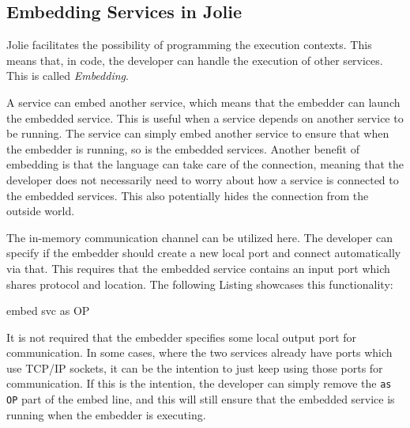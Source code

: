 \subsection{Embedding Services in Jolie}
Jolie facilitates the possibility of programming the execution contexts.
This means that, in code, the developer can handle the execution of other services. This is called \textit{Embedding}.

A service can embed another service, which means that the embedder can launch the embedded service. This is useful when a service depends on another service to be running.
The service can simply embed another service to ensure that when the embedder is running, so is the embedded services.
Another benefit of embedding is that the language can take care of the connection, meaning that the developer does not necessarily need to worry about how a service is connected to the embedded services.
This also potentially hides the connection from the outside world.

The in-memory communication channel can be utilized here. The developer can specify if the embedder should create a new local port and connect automatically via that. This requires that the embedded service contains an input port which shares protocol and location.
The following Listing showcases this functionality:

\begin{jolisting}[][caption={
    }, label=lst:embed-as]
embed svc as OP
\end{jolisting}

It is not required that the embedder specifies some local output port for communication. In some cases, where the two services already have ports which use TCP/IP sockets,
it can be the intention to just keep using those ports for communication. If this
is the intention, the developer can simply remove the \texttt{as OP} part of the embed line, and this will still ensure that the embedded service is running when the embedder is executing.

